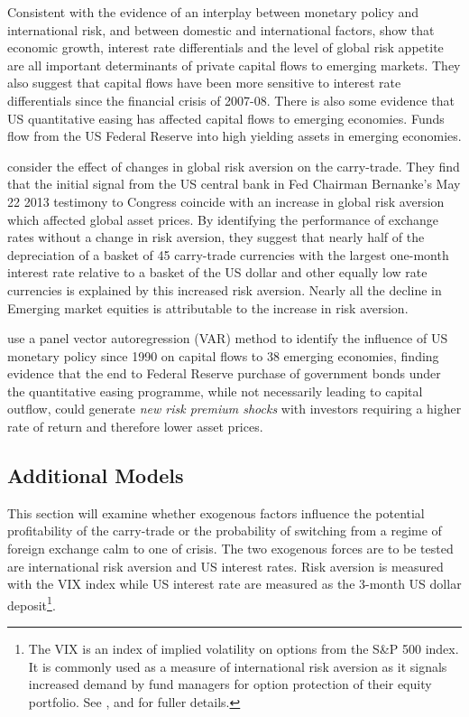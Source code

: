\documentclass[12pt, a4paper, oneside]{article}\usepackage[]{graphicx}\usepackage[]{color}
\begin{document}
  Consistent with the evidence of an interplay between monetary policy and international risk, and between domestic and international factors, \citet{Ahmed2014} show that economic growth, interest rate differentials and the level of global risk appetite are all important determinants of private capital flows to emerging markets.  They also suggest that capital flows have been more sensitive to interest rate differentials since the financial crisis of 2007-08. There is also some evidence that US quantitative easing has affected capital flows to emerging economies.  Funds flow from the US Federal Reserve into high yielding assets in emerging economies. 

\citet{NYFedtaper} consider the effect of changes in global risk aversion on the carry-trade.  They find that the initial signal from the US central bank in Fed Chairman Bernanke's May 22 2013 testimony to Congress coincide with an increase in global risk aversion which affected global asset prices.  By identifying the performance of exchange rates without a change in risk aversion, they suggest that nearly half of the depreciation of a basket of 45 carry-trade currencies with the largest one-month interest rate relative to a basket of the US dollar and other equally low rate currencies is explained by this increased risk aversion. Nearly all the decline in Emerging market equities is attributable to the increase in risk aversion.

\citet{IMFLatam} use a panel vector autoregression (VAR) method to identify the influence of US monetary policy since 1990 on capital flows to 38 emerging economies, finding evidence that the end to Federal Reserve purchase of government bonds under the quantitative easing programme, while not necessarily leading to capital outflow, could generate \emph{new risk premium shocks} with investors requiring a higher rate of return and therefore lower asset prices.

\subsection{Additional Models}
This section will examine whether exogenous factors influence the potential profitability of the carry-trade or the probability of switching from a regime of foreign exchange calm to one of crisis.  The two exogenous forces are to be tested are international risk aversion and US interest rates.  Risk aversion is measured with the VIX index while US interest rate are measured as the 3-month US dollar deposit\footnote{The VIX is an index of implied volatility on options from the S\&P 500 index.  It is commonly used as a measure of international risk aversion as it signals increased demand by fund managers for option protection of their equity portfolio.  See \citet{VIX}, \citet{GoldmanVol} and \citet{Diamond} for fuller details.}.   
\end{document}
